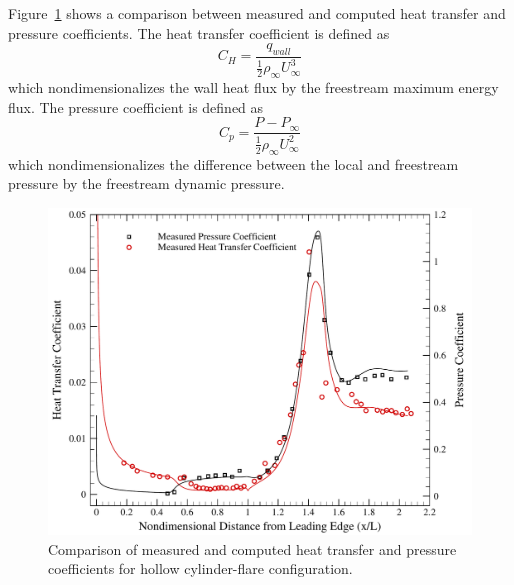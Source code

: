 \clearpage
Figure~\ref{fig:hollow_cylinder_ch_cp} shows a comparison between measured and computed heat transfer and pressure coefficients. The heat transfer coefficient is defined as
\begin{equation}
  C_H = \frac{q_{wall}}{\frac{1}{2} \rho_\infty U_\infty^3}
\end{equation}
which nondimensionalizes the wall heat flux by the freestream maximum energy flux. The pressure coefficient is defined as
\begin{equation}
  C_p = \frac{P-P_\infty}{\frac{1}{2} \rho_\infty U_\infty^2}
\end{equation}
which nondimensionalizes the difference between the local and freestream pressure by the freestream dynamic pressure.
\begin{figure}[hbtp]
  \begin{center}
    \includegraphics[width=\textwidth]{figures/holden_hollow_cylinder/ch_cp_comparison}
    \caption[Comparison of measured and computed heat transfer and pressure coefficients for hollow cylinder-flare configuration.]{Comparison of measured and computed heat transfer and pressure coefficients for hollow cylinder-flare configuration.\label{fig:hollow_cylinder_ch_cp}}
  \end{center}  
\end{figure}


